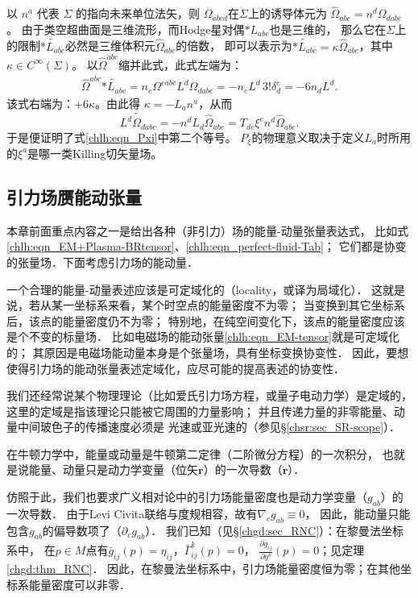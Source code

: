 以 $n^a$ 代表 $\Sigma$ 的指向未来单位法矢，则 $\Omega_{a b c d}$在$\Sigma$上的诱导体元为
$\hat{\Omega}_{a b c}=n^d \Omega_{d a b c}$。
由于类空超曲面是三维流形，而Hodge星对偶$*L_{abc}$也是三维的，
那么它在$\Sigma$上的限制$\widetilde{*L_{abc}}$必然是三维体积元$\hat{\Omega}_{a b c}$的倍数，
即可以表示为$\widetilde{*L_{abc}} = \kappa \hat{\Omega}_{abc}$，其中$\kappa\in C^\infty(\Sigma)$。
以$\hat{\Omega}^{abc}$缩并此式，此式左端为：
\begin{align*}
	\hat{\Omega}^{abc}\widetilde{*L_{abc}}=n_e \Omega^{eabc} L^d \Omega_{dabc}
	=-n_e L^d\, 3! \delta_d^e = -6 n_d L^d .
\end{align*}
该式右端为：$+6 \kappa$。由此得 $\kappa=-L_a n^a$，从而
\begin{equation}
	\widetilde{L^d \Omega_{dabc}}=-n^d L_d \hat{\Omega}_{abc}=T_{de} \xi^e n^d \hat{\Omega}_{abc}.
\end{equation}
于是便证明了式\eqref{chlh:eqn_Pxi}中第二个等号。
$P_{\xi}$的物理意义取决于定义$L_a$时所用的$\xi^a$是哪一类Killing切矢量场。




\subsection{引力场赝能动张量}

本章前面重点内容之一是给出各种（非引力）场的能量-动量张量表达式，
比如式\eqref{chlh:eqn_EM+Plasma-BRtensor}、\eqref{chlh:eqn_perfect-fluid-Tab}；
它们都是协变的张量场．下面考虑引力场的能动量．

一个合理的能量-动量表述应该是可定域化的（locality，或译为局域化）．
这就是说，若从某一坐标系来看，某个时空点的能量密度不为零；
当变换到其它坐标系后，该点的能量密度仍不为零；
特别地，在纯空间变化下，该点的能量密度应该是个不变的标量场．
比如电磁场的能动张量\eqref{chlh:eqn_EM-tensor}就是可定域化的；
其原因是电磁场能动量本身是个张量场，具有坐标变换协变性．
因此，要想使得引力场的能动张量表述定域化，应尽可能的提高表述的协变性．


我们还经常说某个物理理论（比如爱氏引力场方程，或量子电动力学）是定域的，
这里的定域是指该理论只能被它周围的力量影响；
并且传递力量的非零能量、动量中间玻色子的传播速度必须是
光速或亚光速的（参见\S\ref{chsr:sec_SR-scope}）．

在牛顿力学中，能量或动量是牛顿第二定律（二阶微分方程）的一次积分，
也就是说能量、动量只是动力学变量（位矢$\boldsymbol{r}$）的一次导数（$\dot{\boldsymbol{r}}$）．

仿照于此，我们也要求广义相对论中的引力场能量密度也是动力学变量（$g_{ab}$）的一次导数．
由于Levi Civita联络与度规相容，故有$\nabla_c g_{ab}\equiv 0$，
因此，能动量只能包含$g_{ab}$的偏导数项了（$\partial_c g_{ab}$）．
我们已知（见\S\ref{chgd:sec_RNC}）：在黎曼法坐标系中， 
在$p\in M$点有$\bar{g}_{ij}(p)=\eta_{ij}$，$\bar{\Gamma}_{ij}^k(p)=0$，
$\frac{\partial \bar{g}_{ij}}{\partial y^k}(p)=0$；见定理\ref{chgd:thm_RNC}．
因此，在黎曼法坐标系中，引力场能量密度恒为零；在其他坐标系能量密度可以非零．

